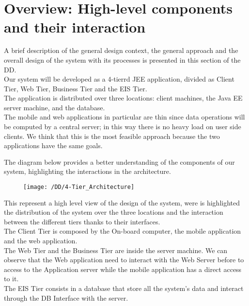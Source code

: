 \section{Overview: High-level components and their interaction}
A brief description of the general design context, the general approach and the overall design of the system with its processes is presented in this section of the DD.
\\Our system will be developed as a 4-tierrd JEE application, divided as Client Tier, Web Tier, Business Tier and the EIS Tier. %
\\The application is distributed over three locations: client machines, the Java EE server machine, and the database.
\\The mobile and web applications in particular are thin since data operations will be computed by a central server; in this way there is no heavy load on user side clients. We think that this is the most feasible approach because the two applications have the same goals. 


The diagram below provides a better understanding of the components of our system, highlighting the interactions in the architecture.
\begin{figure}[!h]
  \centering
  \vspace{0.2cm}
  \texttt{[image: /DD/4-Tier\_Architecture]}\\%
  \vspace{0.4cm}
  \label{fig:4-Tier_Architecture} 
\end{figure}

This represent a high level view of the design of the system, were is highlighted the distribution of the system over the three locations and the interaction between the different tiers thanks to their interfaces.
\\The Client Tier is composed by the On-board computer, the mobile application and the web application.
\\The Web Tier and the Business Tier are inside the server machine. We can observe that the Web application need to interact with the Web Server before to access to the Application server while the mobile application has a direct access to it.
\\The EIS Tier consists in a database that store all the system's data and interact through the DB Interface with the server.

